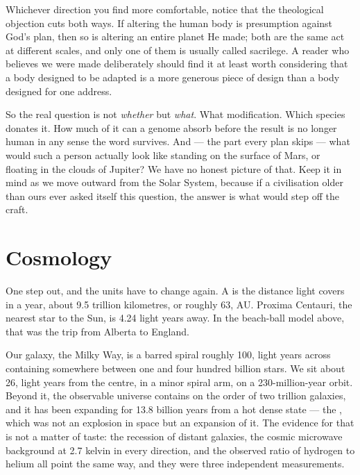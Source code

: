 Whichever direction you find more comfortable, notice that the theological objection cuts both
ways. If altering the human body is presumption against God's plan, then so is altering an entire
planet He made; both are the same act at different scales, and only one of them is usually called
sacrilege. A reader who believes we were made deliberately should find it at least worth
considering that a body designed to be adapted is a more generous piece of design than a body
designed for one address.

So the real question is not \emph{whether} but \emph{what}. What modification. Which species
donates it. How much of it can a genome absorb before the result is no longer human in any sense
the word survives. And --- the part every plan skips --- what would such a person actually look
like standing on the surface of Mars, or floating in the clouds of Jupiter? We have no honest
picture of that. Keep it in mind as we move outward from the Solar System, because if a
civilisation older than ours ever asked itself this question, the answer is what would step off
the craft.


\section{Cosmology}\label{sec:cosmology}

One step out, and the units have to change again. A  is the distance light
covers in a year, about 9.5 trillion kilometres, or roughly 63, AU. Proxima Centauri, the
nearest star to the Sun, is 4.24 light years away. In the beach-ball model above, that was the
trip from Alberta to England.

Our galaxy, the Milky Way, is a barred spiral roughly 100, light years across containing
somewhere between one and four hundred billion stars. We sit about 26, light years from
the centre, in a minor spiral arm, on a 230-million-year orbit. Beyond it, the observable
universe contains on the order of two trillion galaxies, and it has been expanding for 13.8
billion years from a hot dense state --- the , which was not an explosion in
space but an expansion of it. The evidence for that is not a matter of taste: the recession of
distant galaxies, the cosmic microwave background at 2.7 kelvin in every direction, and the
observed ratio of hydrogen to helium all point the same way, and they were three independent
measurements.


